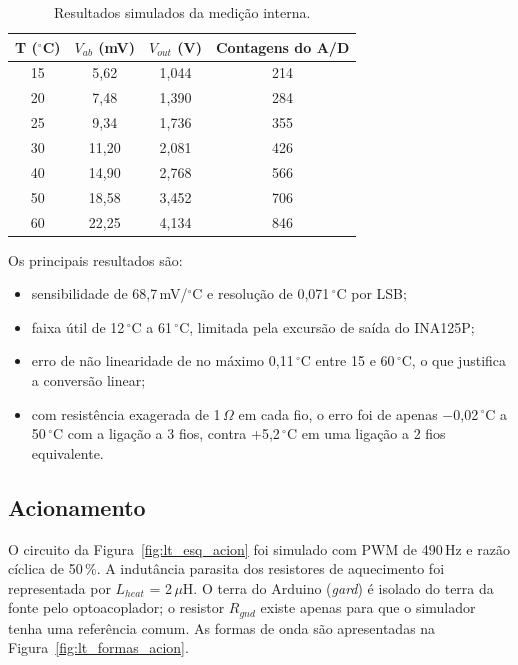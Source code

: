 \documentclass[a4paper,11pt]{article}
\begin{document}
\begin{table}[H]
\centering
\small
\renewcommand{\arraystretch}{1.2}
\caption{Resultados simulados da medição interna.}
\label{tab:sim_pt100}
\begin{tabular}{cccc}
\toprule
\textbf{T (\ensuremath{^\circ}C)} & \textbf{$V_{ab}$ (mV)} & \textbf{$V_{out}$ (V)} & \textbf{Contagens do A/D} \\
\midrule
15 & 5,62  & 1,044 & 214 \\
20 & 7,48  & 1,390 & 284 \\
25 & 9,34  & 1,736 & 355 \\
30 & 11,20 & 2,081 & 426 \\
40 & 14,90 & 2,768 & 566 \\
50 & 18,58 & 3,452 & 706 \\
60 & 22,25 & 4,134 & 846 \\
\bottomrule
\end{tabular}
\end{table}

Os principais resultados são:
\begin{itemize}
  \item sensibilidade de 68,7\,mV/\ensuremath{^\circ}C e resolução de 0,071\,\ensuremath{^\circ}C por LSB;
  \item faixa útil de 12\,\ensuremath{^\circ}C a 61\,\ensuremath{^\circ}C, limitada pela excursão de saída do INA125P;
  \item erro de não linearidade de no máximo 0,11\,\ensuremath{^\circ}C entre 15 e 60\,\ensuremath{^\circ}C, o que justifica a conversão linear;
  \item com resistência exagerada de 1\,$\Omega$ em cada fio, o erro foi de apenas $-$0,02\,\ensuremath{^\circ}C a 50\,\ensuremath{^\circ}C com a ligação a 3 fios, contra +5,2\,\ensuremath{^\circ}C em uma ligação a 2 fios equivalente.
\end{itemize}

\subsection{Acionamento}

O circuito da Figura~\ref{fig:lt_esq_acion} foi simulado com PWM de 490\,Hz e razão cíclica de 50\,\%. A indutância parasita dos resistores de aquecimento foi representada por $L_{heat}$ = 2\,$\mu$H. O terra do Arduino (\textit{gard}) é isolado do terra da fonte pelo optoacoplador; o resistor $R_{gnd}$ existe apenas para que o simulador tenha uma referência comum. As formas de onda são apresentadas na Figura~\ref{fig:lt_formas_acion}.
\end{document}
